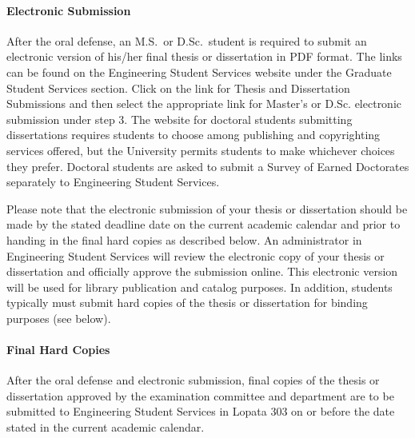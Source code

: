 \paragraph{Electronic Submission}

After the oral defense, an M.S.\ or D.Sc.\ student is required to submit an
electronic version of his/her final thesis or dissertation in PDF format.  The
links can be found on the Engineering Student Services website under the Graduate
Student Services section.  Click on the link for Thesis and Dissertation Submissions 
and then select the appropriate link for Master's or D.Sc. electronic submission under 
step 3. The website for doctoral students submitting
dissertations requires students to choose among publishing and copyrighting
services offered, but the University permits students to make whichever choices
they prefer. Doctoral students are asked to submit a Survey of Earned
Doctorates separately to Engineering Student Services. 

Please note that the electronic submission of your thesis or dissertation
should be made by the stated deadline date on the current academic calendar and
prior to handing in the final hard copies as described below.  An administrator
in Engineering Student Services will review the electronic copy of your thesis
or dissertation and officially approve the submission online.  This electronic
version will be used for library publication and catalog purposes. In addition,
students typically must submit hard copies of the thesis or dissertation for
binding purposes (see below).  

\paragraph{Final Hard Copies}

After the oral defense and electronic submission, final copies of the thesis or
dissertation approved by the examination committee and department are to be
submitted to Engineering Student Services in Lopata 303 on or before the date
stated in the current academic calendar.


